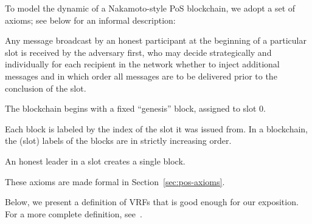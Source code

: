 To model the dynamic of a Nakamoto-style PoS blockchain, 
we adopt a set of axioms; see below for an informal description:

\begin{description}[font=\normalfont\itshape\space]
  \item[Message delivery.] 
    Any message broadcast by an honest participant at the beginning of a
    particular slot is received by the adversary first, who may decide
    strategically and individually for each recipient in the network
    whether to inject additional messages and in which order all messages
    are to be delivered prior to the conclusion of the slot. 

  \item[Genesis block.]
  The blockchain begins with a fixed ``genesis'' block, assigned to slot $0$.
  
  \item[Block monotonicity] 
  Each block is labeled by the index of the slot it was issued from. 
  In a blockchain, the (slot) labels of the blocks are in strictly increasing order.

  \item[Honest blocks.] 
  An honest leader in a slot creates a single block.
\end{description}
These axioms are made formal in Section~\ref{sec:pos-axioms}.






Below, we present a definition of VRFs that is good enough for our exposition. 
For a more complete definition, see~\cite{VRF}.


